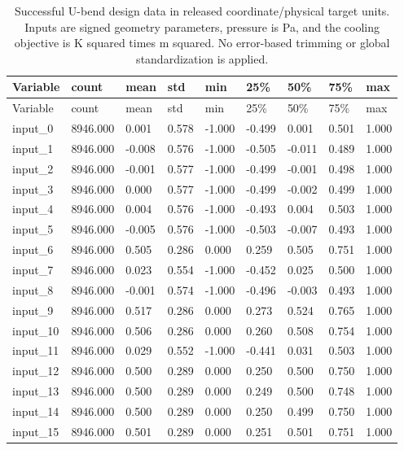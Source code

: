 \begingroup\small\setlength{\tabcolsep}{3pt}\begin{longtable}{lllllllll}
\caption{Successful U-bend design data in released coordinate/physical target units. Inputs are signed geometry parameters, pressure is Pa, and the cooling objective is K squared times m squared. No error-based trimming or global standardization is applied.}\label{tab:ubend-dataset_summary}\\\toprule
Variable & count & mean & std & min & 25\% & 50\% & 75\% & max\\\midrule
\endfirsthead\toprule
Variable & count & mean & std & min & 25\% & 50\% & 75\% & max\\\midrule
\endhead
input\_0 & 8946.000 & 0.001 & 0.578 & -1.000 & -0.499 & 0.001 & 0.501 & 1.000\\
input\_1 & 8946.000 & -0.008 & 0.576 & -1.000 & -0.505 & -0.011 & 0.489 & 1.000\\
input\_2 & 8946.000 & -0.001 & 0.577 & -1.000 & -0.499 & -0.001 & 0.498 & 1.000\\
input\_3 & 8946.000 & 0.000 & 0.577 & -1.000 & -0.499 & -0.002 & 0.499 & 1.000\\
input\_4 & 8946.000 & 0.004 & 0.576 & -1.000 & -0.493 & 0.004 & 0.503 & 1.000\\
input\_5 & 8946.000 & -0.005 & 0.576 & -1.000 & -0.503 & -0.007 & 0.493 & 1.000\\
input\_6 & 8946.000 & 0.505 & 0.286 & 0.000 & 0.259 & 0.505 & 0.751 & 1.000\\
input\_7 & 8946.000 & 0.023 & 0.554 & -1.000 & -0.452 & 0.025 & 0.500 & 1.000\\
input\_8 & 8946.000 & -0.001 & 0.574 & -1.000 & -0.496 & -0.003 & 0.493 & 1.000\\
input\_9 & 8946.000 & 0.517 & 0.286 & 0.000 & 0.273 & 0.524 & 0.765 & 1.000\\
input\_10 & 8946.000 & 0.506 & 0.286 & 0.000 & 0.260 & 0.508 & 0.754 & 1.000\\
input\_11 & 8946.000 & 0.029 & 0.552 & -1.000 & -0.441 & 0.031 & 0.503 & 1.000\\
input\_12 & 8946.000 & 0.500 & 0.289 & 0.000 & 0.250 & 0.500 & 0.750 & 1.000\\
input\_13 & 8946.000 & 0.500 & 0.289 & 0.000 & 0.249 & 0.500 & 0.748 & 1.000\\
input\_14 & 8946.000 & 0.500 & 0.289 & 0.000 & 0.250 & 0.499 & 0.750 & 1.000\\
input\_15 & 8946.000 & 0.501 & 0.289 & 0.000 & 0.251 & 0.501 & 0.751 & 1.000\\

\end{longtable}
